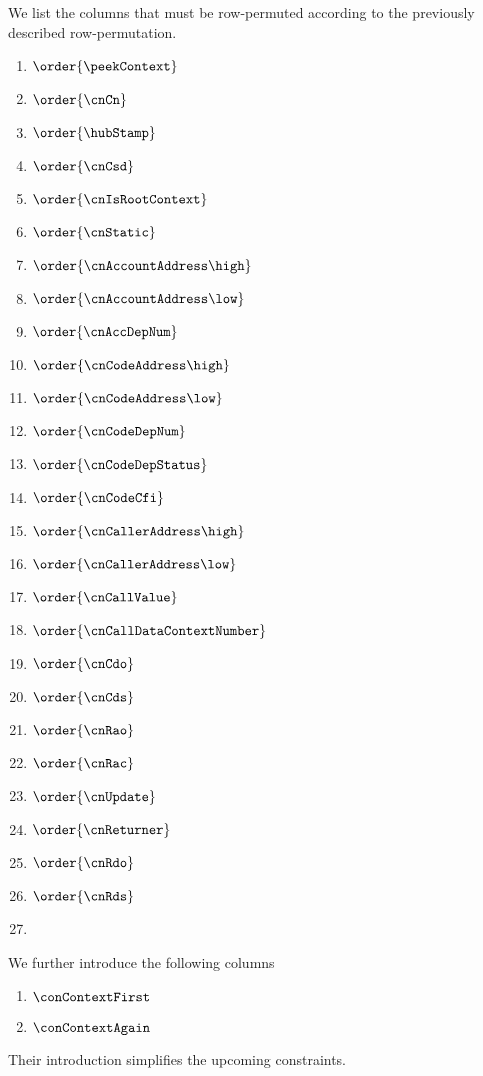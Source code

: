 We list the columns that must be row-permuted according to the previously described row-permutation.
\begin{multicols}{3}
	\begin{enumerate}
		\item $\order{\peekContext}$
		\item $\order{\cnCn}$
		\item $\order{\hubStamp}$
		\item $\order{\cnCsd}$
		\item $\order{\cnIsRootContext}$
		\item $\order{\cnStatic}$
		\item $\order{\cnAccountAddress\high}$
		\item $\order{\cnAccountAddress\low}$
		\item $\order{\cnAccDepNum}$
		\item $\order{\cnCodeAddress\high}$
		\item $\order{\cnCodeAddress\low}$
		\item $\order{\cnCodeDepNum}$
		\item $\order{\cnCodeDepStatus}$
		\item $\order{\cnCodeCfi}$
		\item $\order{\cnCallerAddress\high}$
		\item $\order{\cnCallerAddress\low}$
		\item $\order{\cnCallValue}$
		\item $\order{\cnCallDataContextNumber}$
		\item $\order{\cnCdo}$
		\item $\order{\cnCds}$
		\item $\order{\cnRao}$
		\item $\order{\cnRac}$
		\item $\order{\cnUpdate}$
		\item $\order{\cnReturner}$
		\item $\order{\cnRdo}$
		\item $\order{\cnRds}$
		\item[\vspace{\fill}]
	\end{enumerate}
\end{multicols}
\noindent We further introduce the following columns
\begin{multicols}{2}
        \begin{enumerate}
		\item $\conContextFirst$
		\item $\conContextAgain$
        \end{enumerate}
\end{multicols}
\noindent Their introduction simplifies the upcoming constraints.
